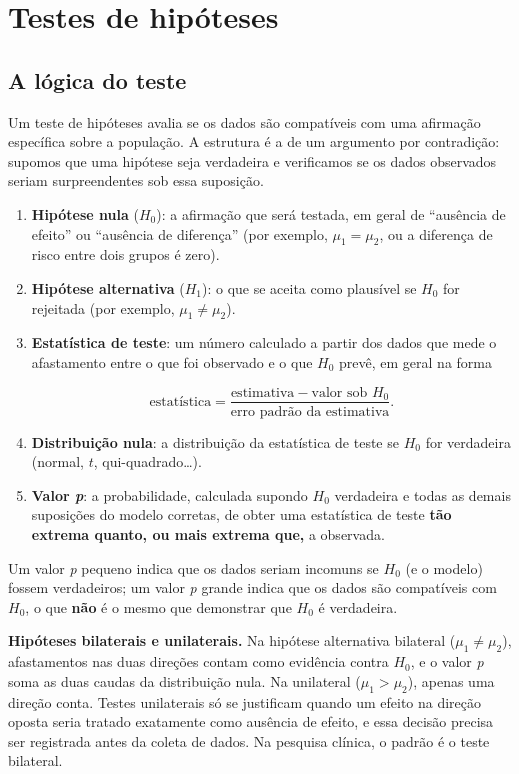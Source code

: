 \documentclass[
]{book}
\begin{document}
\section{Testes de hipóteses}\label{testes-de-hipuxf3teses}

\subsection{A lógica do teste}\label{a-luxf3gica-do-teste}

Um teste de hipóteses avalia se os dados são compatíveis com uma afirmação específica sobre a população. A estrutura é a de um argumento por contradição: supomos que uma hipótese seja verdadeira e verificamos se os dados observados seriam surpreendentes sob essa suposição.

\begin{enumerate}
\def\labelenumi{\arabic{enumi}.}
\item
  \textbf{Hipótese nula} (\(H_0\)): a afirmação que será testada, em geral de ``ausência de efeito'' ou ``ausência de diferença'' (por exemplo, \(\mu_1 = \mu_2\), ou a diferença de risco entre dois grupos é zero).
\item
  \textbf{Hipótese alternativa} (\(H_1\)): o que se aceita como plausível se \(H_0\) for rejeitada (por exemplo, \(\mu_1 \neq \mu_2\)).
\item
  \textbf{Estatística de teste}: um número calculado a partir dos dados que mede o afastamento entre o que foi observado e o que \(H_0\) prevê, em geral na forma

  \[
   \text{estatística} = \frac{\text{estimativa} - \text{valor sob } H_0}{\text{erro padrão da estimativa}}.
   \]
\item
  \textbf{Distribuição nula}: a distribuição da estatística de teste se \(H_0\) for verdadeira (normal, \(t\), qui-quadrado\ldots).
\item
  \textbf{Valor \emph{p}}: a probabilidade, calculada supondo \(H_0\) verdadeira e todas as demais suposições do modelo corretas, de obter uma estatística de teste \textbf{tão extrema quanto, ou mais extrema que,} a observada.
\end{enumerate}

Um valor \emph{p} pequeno indica que os dados seriam incomuns se \(H_0\) (e o modelo) fossem verdadeiros; um valor \emph{p} grande indica que os dados são compatíveis com \(H_0\), o que \textbf{não} é o mesmo que demonstrar que \(H_0\) é verdadeira.

\textbf{Hipóteses bilaterais e unilaterais.} Na hipótese alternativa bilateral (\(\mu_1 \neq \mu_2\)), afastamentos nas duas direções contam como evidência contra \(H_0\), e o valor \emph{p} soma as duas caudas da distribuição nula. Na unilateral (\(\mu_1 > \mu_2\)), apenas uma direção conta. Testes unilaterais só se justificam quando um efeito na direção oposta seria tratado exatamente como ausência de efeito, e essa decisão precisa ser registrada antes da coleta de dados. Na pesquisa clínica, o padrão é o teste bilateral.
\end{document}

